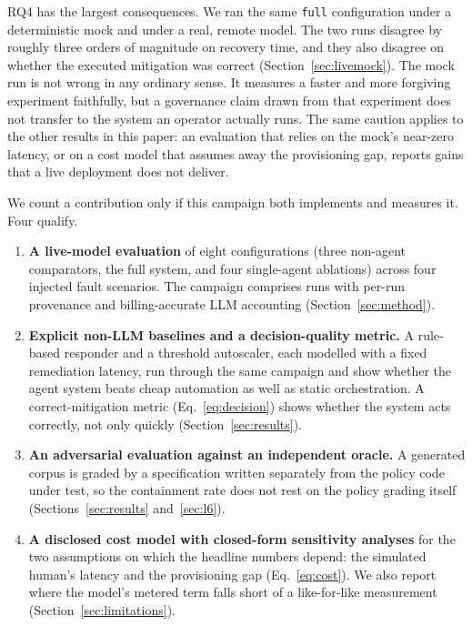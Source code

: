 RQ4 has the largest consequences. We ran the same \texttt{full} configuration under a deterministic
mock and under a real, remote model. The two runs disagree by roughly three orders of magnitude on
recovery time, and they also disagree on whether the executed mitigation was correct
(Section~\ref{sec:livemock}). The mock run is not wrong in any ordinary sense. It measures a faster
and more forgiving experiment faithfully, but a governance claim drawn from that experiment does not
transfer to the system an operator actually runs. The same caution applies to the other results in
this paper: an evaluation that relies on the mock's near-zero latency, or on a cost model that assumes
away the provisioning gap, reports gains that a live deployment does not deliver.

We count a contribution only if this campaign both implements and measures it. Four qualify.
\begin{enumerate}
  \item \textbf{A live-model evaluation} of eight configurations (three non-agent comparators, the
    full system, and four single-agent ablations) across four injected fault scenarios. The campaign
    comprises \NRunsTotal{} runs with per-run provenance and billing-accurate LLM accounting
    (Section~\ref{sec:method}).
  \item \textbf{Explicit non-LLM baselines and a decision-quality metric.} A rule-based responder and
    a threshold autoscaler, each modelled with a fixed remediation latency, run through the same
    campaign and show whether the agent system beats cheap automation as well as static
    orchestration. A correct-mitigation metric (Eq.~\eqref{eq:decision}) shows whether the system acts
    correctly, not only quickly (Section~\ref{sec:results}).
  \item \textbf{An adversarial evaluation against an independent oracle.} A generated corpus is graded
    by a specification written separately from the policy code under test, so the containment rate
    does not rest on the policy grading itself (Sections~\ref{sec:results} and~\ref{sec:l6}).
  \item \textbf{A disclosed cost model with closed-form sensitivity analyses} for the two assumptions
    on which the headline numbers depend: the simulated human's latency and the provisioning gap
    (Eq.~\eqref{eq:cost}). We also report where the model's metered term falls short of a like-for-like
    measurement (Section~\ref{sec:limitations}).
\end{enumerate}

